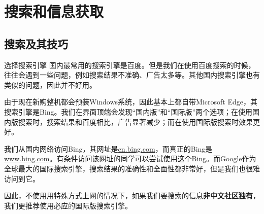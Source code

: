 \documentclass{beamer}
\begin{document}
\section{搜索和信息获取}

\subsection{搜索及其技巧}

\begin{frame}{选择搜索引擎}
    国内最常用的搜索引擎是百度。但是我们在使用百度搜索的时候，往往会遇到一些问题，例如搜索结果不准确、广告太多等。其他国内搜索引擎也有类似的问题，因此并不好用。

    由于现在新购整机都会预装Windows系统，因此基本上都自带Microsoft Edge，其搜索引擎是Bing。我们在界面顶端会发现“国内版”和“国际版”两个选项；在使用国内版搜索时，搜索结果和百度相比，广告显著减少；而在使用国际版搜索时效果更好。

    我们从国内网络访问Bing，其网址是\href{https://cn.bing.com/}{cn.bing.com}，而真正的Bing是\href{https://www.bing.com/}{www.bing.com}。有条件访问该网址的同学可以尝试使用这个Bing。而Google作为全球最大的国际搜索引擎，搜索结果的准确性和全面性都非常好，但是我们也很难访问到它。

    因此，不使用用特殊方式上网的情况下，如果我们要搜索的信息\textbf{非中文社区独有}，我们更推荐使用必应的国际版搜索引擎。
\end{frame}
\end{document}
